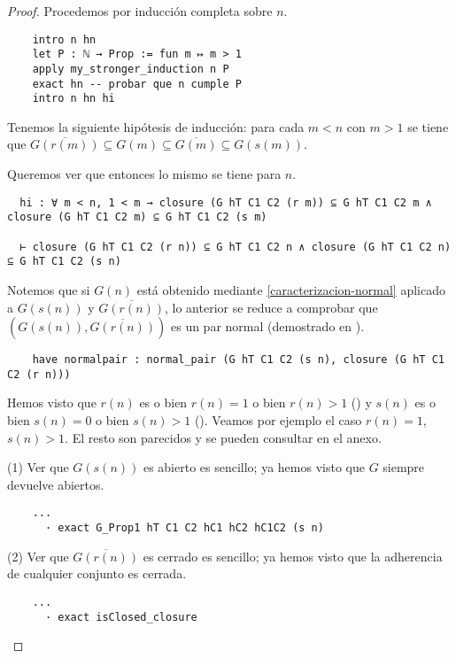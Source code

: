 \begin{proof}
  Procedemos por inducción completa sobre $n$.

  \begin{lstlisting}
    intro n hn
    let P : ℕ → Prop := fun m ↦ m > 1
    apply my_stronger_induction n P
    exact hn -- probar que n cumple P
    intro n hn hi \end{lstlisting}

  Tenemos la siguiente hipótesis de inducción: para cada $m < n$ con $m > 1$ se tiene que $\overline{G(r(m))} \subseteq G(m) \subseteq \overline{G(m)} \subseteq G(s(m))$.

  Queremos ver que entonces lo mismo se tiene para $n$.

  \begin{lstlisting}
  hi : ∀ m < n, 1 < m → closure (G hT C1 C2 (r m)) ⊆ G hT C1 C2 m ∧ closure (G hT C1 C2 m) ⊆ G hT C1 C2 (s m)

  ⊢ closure (G hT C1 C2 (r n)) ⊆ G hT C1 C2 n ∧ closure (G hT C1 C2 n) ⊆ G hT C1 C2 (s n) \end{lstlisting}

  Notemos que si $G(n)$ está obtenido mediante \ref{caracterizacion-normal} aplicado a $G(s(n))$ y $\overline{G(r(n))}$, lo anterior se reduce a comprobar que $(G(s(n)), \overline{G(r(n))})$ es un par normal (demostrado en ).

  \begin{lstlisting}
    have normalpair : normal_pair (G hT C1 C2 (s n), closure (G hT C1 C2 (r n))) \end{lstlisting}

  Hemos visto que $r(n)$ es o bien $r(n) = 1$ o bien $r(n) > 1$ () y $s(n)$ es o bien $s(n) = 0$ o bien $s(n) > 1$ (). Veamos por ejemplo el caso $r(n) = 1$, $s(n) > 1$. El resto son parecidos y se pueden consultar en el anexo.

  (1) Ver que $G(s(n))$ es abierto es sencillo; ya hemos visto que $G$ siempre devuelve abiertos.

  \begin{lstlisting}
    ...
      · exact G_Prop1 hT C1 C2 hC1 hC2 hC1C2 (s n) \end{lstlisting}

  (2) Ver que $\overline{G(r(n))}$ es cerrado es sencillo; ya hemos visto que la adherencia de cualquier conjunto es cerrada.

  \begin{lstlisting}
    ...
      · exact isClosed_closure \end{lstlisting}


\end{proof}
